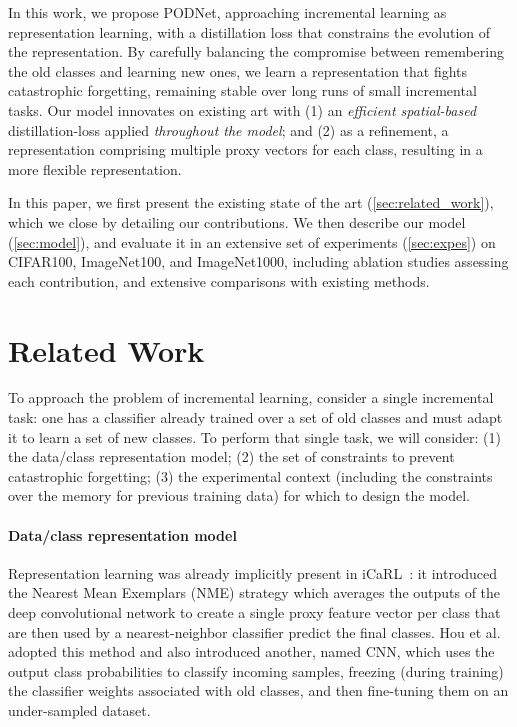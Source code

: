 In this work, we propose PODNet, approaching incremental learning as representation learning, with a
distillation loss that constrains the evolution of the representation. By carefully balancing the
compromise between remembering the old classes and learning new ones, we learn a representation that
fights catastrophic forgetting, remaining stable over long runs of small incremental tasks. Our
model innovates on existing art with (1) an \textit{efficient spatial-based} distillation-loss
applied \textit{throughout the model}; and (2) as a refinement, a representation comprising multiple
proxy vectors for each class, resulting in a more flexible representation.

In this paper, we first present the existing state of the art (\autoref{sec:related_work}), which we
close by detailing our contributions. We then describe our model (\autoref{sec:model}), and evaluate
it in an extensive set of experiments (\autoref{sec:expes}) on CIFAR100, ImageNet100, and
ImageNet1000, including ablation studies assessing each contribution, and extensive comparisons with
existing methods.

\section{Related Work}
\label{sec:related_work}

To approach the problem of incremental learning, consider a single incremental task: one has a
classifier already trained over a set of old classes and must adapt it to learn a set of new
classes. To perform that single task, we will consider: (1) the data/class representation model; (2)
the set of constraints to prevent catastrophic forgetting; (3) the experimental context (including
the constraints over the memory for previous training data) for which to design the model.

\paragraph{Data/class representation model} Representation learning was already implicitly present in
iCaRL~\citep{rebuffi2017icarl}: it introduced the Nearest Mean Exemplars (NME) strategy which
averages the outputs of the deep convolutional network to create a single proxy feature vector per
class that are then used by a nearest-neighbor classifier predict the final classes. Hou et
al.~\citep{hou2019ucir} adopted this method and also introduced another, named CNN, which uses the
output class probabilities to classify incoming samples, freezing (during training) the classifier
weights associated with old classes, and then fine-tuning them on an under-sampled dataset.

